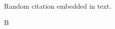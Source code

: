 \documentclass{article}
\begin{document}
Random citation \cite{DUMMY:1} embedded in text.

\newpage

 B

\end{document}
